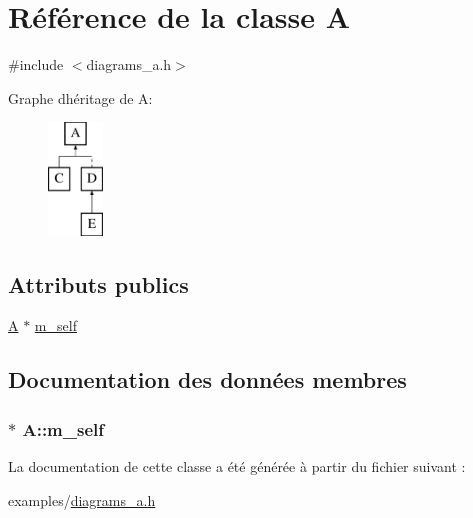 \hypertarget{class_a}{}\section{Référence de la classe A}
\label{class_a}


{\ttfamily \#include $<$diagrams\+\_\+a.\+h$>$}

Graphe d\textquotesingle{}héritage de A\+:\begin{figure}[H]
\begin{center}
\leavevmode
\includegraphics[height=3.000000cm]{class_a}
\end{center}
\end{figure}
\subsection*{Attributs publics}
\begin{DoxyCompactItemize}
\item 
\hyperlink{class_a}{A} $\ast$ \hyperlink{class_a_a086d3a4efc697dba0601b9fef3d082ad}{m\+\_\+self}
\end{DoxyCompactItemize}


\subsection{Documentation des données membres}
\hypertarget{class_a_a086d3a4efc697dba0601b9fef3d082ad}{}
\subsubsection[{m\+\_\+self}]{$\ast$ A\+::m\+\_\+self}\label{class_a_a086d3a4efc697dba0601b9fef3d082ad}


La documentation de cette classe a été générée à partir du fichier suivant \+:\begin{DoxyCompactItemize}
\item 
examples/\hyperlink{diagrams__a_8h}{diagrams\+\_\+a.\+h}\end{DoxyCompactItemize}
